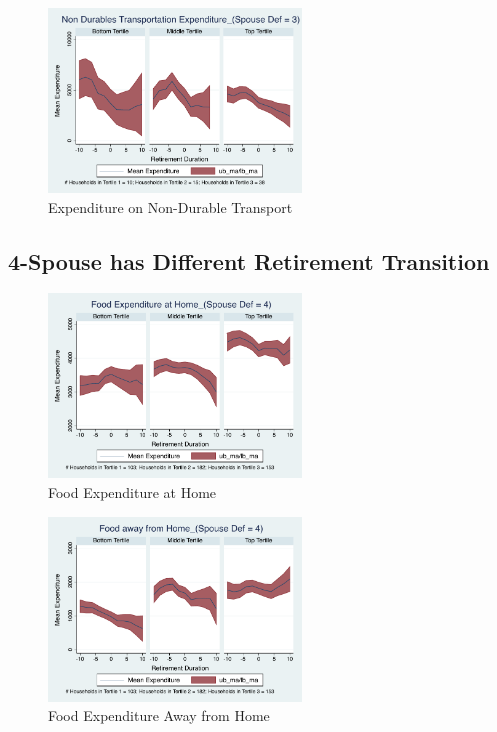 \documentclass[11pt]{article}
\begin{document}
\begin{figure}[h]
	\caption{Expenditure on Non-Durable Transport}
	\centering
	\includegraphics[width=0.6\textwidth]{../ConsumptionPostRetirement_by_SpouseDef_Cats/Smoothed/3/spouse_def_total_transport_real.pdf}
\end{figure}
\clearpage


\subsection{4-Spouse has Different Retirement Transition}

\begin{figure}[h]
	\caption{Food Expenditure at Home}
	\centering
	\includegraphics[width=0.6\textwidth]{../ConsumptionPostRetirement_by_SpouseDef_Cats/Smoothed/4/spouse_def_total_foodexp_home_real.pdf}
\end{figure}


\begin{figure}[h]
	\caption{Food Expenditure Away from Home}
	\centering
	\includegraphics[width=0.6\textwidth]{../ConsumptionPostRetirement_by_SpouseDef_Cats/Smoothed/4/spouse_def_total_foodexp_away_real.pdf}
\end{figure}
\end{document}
